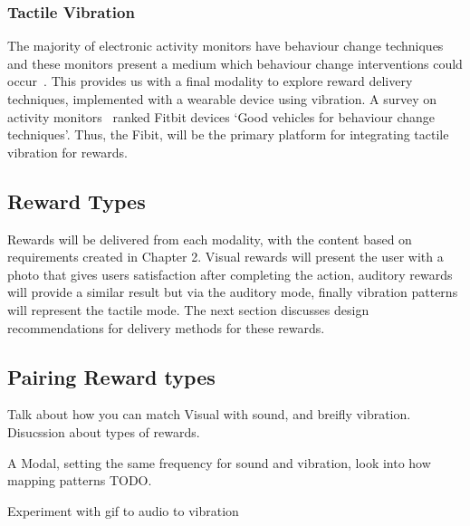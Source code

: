 \subsubsection*{Tactile Vibration}
The majority of electronic activity monitors have behaviour change techniques and these monitors present a medium which behaviour change interventions could occur~\cite{article_wearable_good}.
This provides us with a final modality to explore reward delivery techniques, implemented with a wearable device using vibration.
A survey on activity monitors~\cite{article_wearable_good} ranked Fitbit devices `Good vehicles for behaviour change techniques'.
Thus, the Fibit, will be the primary platform for integrating tactile vibration for rewards.

\subsection{Reward Types}
Rewards will be delivered from each modality, with the content based on requirements created in Chapter 2.
Visual rewards will present the user with a photo that gives users satisfaction after completing the action,
auditory rewards will provide a similar result but via the auditory mode, finally vibration patterns will represent the tactile mode.
The next section discusses design recommendations for delivery methods for these rewards.

\subsection{Pairing Reward types}

Talk about how you can match Visual with sound, and breifly vibration.
Disucssion about types of rewards.

A Modal, setting the same frequency for sound and vibration, look into how mapping patterns TODO.

Experiment with gif to audio to vibration
